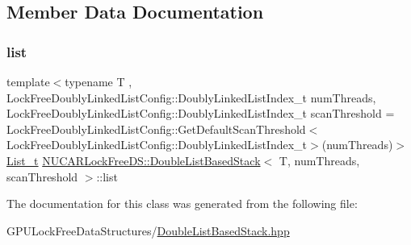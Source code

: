 \subsection{Member Data Documentation}
\mbox{\label{class_n_u_c_a_r_lock_free_d_s_1_1_double_list_based_stack_abc2cb5a9e08f892c83fd811506eddc05}} 
\subsubsection{\texorpdfstring{list}{list}}
{\footnotesize\ttfamily template$<$typename T , Lock\+Free\+Doubly\+Linked\+List\+Config\+::\+Doubly\+Linked\+List\+Index\+\_\+t num\+Threads, Lock\+Free\+Doubly\+Linked\+List\+Config\+::\+Doubly\+Linked\+List\+Index\+\_\+t scan\+Threshold = Lock\+Free\+Doubly\+Linked\+List\+Config\+::\+Get\+Default\+Scan\+Threshold$<$\+Lock\+Free\+Doubly\+Linked\+List\+Config\+::\+Doubly\+Linked\+List\+Index\+\_\+t$>$(num\+Threads)$>$ \\
\mbox{\hyperlink{class_n_u_c_a_r_lock_free_d_s_1_1_double_list_based_stack_a1ef386e8aaa2b4bb17d44df51f0c9f76}{List\+\_\+t}} \mbox{\hyperlink{class_n_u_c_a_r_lock_free_d_s_1_1_double_list_based_stack}{N\+U\+C\+A\+R\+Lock\+Free\+D\+S\+::\+Double\+List\+Based\+Stack}}$<$ T, num\+Threads, scan\+Threshold $>$\+::list\hspace{0.3cm}{\ttfamily [private]}}



The documentation for this class was generated from the following file\+:\begin{DoxyCompactItemize}
\item 
G\+P\+U\+Lock\+Free\+Data\+Structures/\mbox{\hyperlink{_double_list_based_stack_8hpp}{Double\+List\+Based\+Stack.\+hpp}}\end{DoxyCompactItemize}
